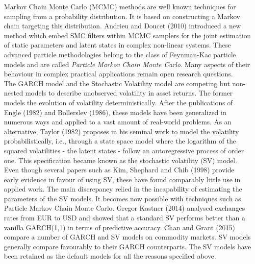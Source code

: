 \documentclass[11pt,a4,twosided,singlespacing,titlepagenumber=on]{scrreprt}
\numberwithin{equation}{chapter} %
\theoremstyle{remark}
\begin{document}
\noindent
Markov Chain Monte Carlo (MCMC) methods are well known techniques for sampling from a probability distribution. It is based on constructing a Markov chain targeting this distribution. Andrieu and Doucet (2010) introduced a new method which embed SMC filters within MCMC samplers for the joint estimation of static parameters and latent states in complex non-linear systems. These advanced particle methodologies belong to the class of Feynman-Kac particle models and are called \textit{Particle Markov Chain Monte Carlo}. Many aspects of their behaviour in complex practical applications remain open research questions. \\

\noindent
The GARCH model and the Stochastic Volatility model are competing but non-nested models to describe unobserved volatility in asset returns. The former models the evolution of volatility deterministically. After the publications of Engle (1982) and Bollerslev (1986), these models have been generalized in numerous ways and applied to a vast amount of real-world problems. As an alternative, Taylor (1982) proposes in his seminal work to model the volatility probabilistically, i.e., through a state space model where the logarithm of the squared volatilities - the latent states - follow an autoregressive process of order one. This specification became known as the stochastic volatility (SV) model. Even though several papers such as Kim, Shephard and Chib (1998) provide early evidence in favour of using SV, these have found comparably little use in applied work. The main discrepancy relied in the incapability of estimating the parameters of the SV models. It becomes now possible with techniques such as Particle Markov Chain Monte Carlo. Gregor Kastner (2014) analysed exchanges rates from EUR to USD and showed that a standard SV performs better than a vanilla GARCH(1,1) in terms of predictive accuracy. Chan and Grant (2015) compare a number of GARCH and SV models on commodity markets. SV models generally compare favourably to their GARCH counterparts. The SV models have been retained as the default models for all the reasons specified above. \\
\end{document}
